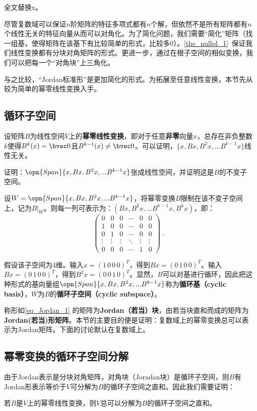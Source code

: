 

\begin{issues}
\issueDraft 全文替换x。
\end{issues}

尽管复数域可以保证$n$阶矩阵的特征多项式都有$n$个解，但依然不是所有矩阵都有$n$个线性无关的特征向量从而可以对角化。为了简化问题，我们需要“简化”矩阵（找一组基，使得矩阵在该基下有比较简单的形式，比较多$0$）。\autoref{the_nullpl_1}~保证我们线性变换都有分块对角矩阵的形式。更进一步，通过在根子空间的相似变换，我们可以把每一个“对角块”上三角化。

与之比较，“Jordan标准形”是更加简化的形式。为拓展至任意线性变换，本节先从较为简单的幂零线性变换入手。
\subsection{循环子空间}
设矩阵$B$为线性空间$V$上的\textbf{幂零线性变换}，即对于任意\textbf{非零}向量$x$，总存在非负整数$k$使得$B^{k}(x)=\bvec 0$且$B^{k-1}(x)\neq \bvec 0$。可以证明，$\{x,Bx,B^2x,...B^{k-1}x\}$线性无关。
\begin{exercise}{}
证明：$\opn{Span}\{x,Bx,B^2x,...B^{k-1}x\}$张成线性空间，并证明这是$B$的不变子空间。
\end{exercise}
设$W=\opn{Span}\{x,Bx,B^2x,...B^{k-1}x\}$，将幂零变换$B$限制在该不变子空间上，记为$B|_W$。则每一列可表示为：$(Bx,B^2x,...B^{k-1}x,B^kx)$，即：
\begin{equation}\label{eq_Jordan_1}
\left(\begin{array}{cccccc}
0 & 0 & 0 & \cdots & 0 & 0 \\
1 & 0 & 0 & \cdots & 0 & 0 \\
0 & 1 & 0 & \cdots & 0 & 0 \\
\vdots & \vdots & \vdots & \ddots & \vdots & \vdots \\
0 & 0 & 0 & \cdots & 1 & 0
\end{array}\right)~.
\end{equation}

假设该子空间为4维。输入$x=(1\,0\,0\,0)^T$，得到$Bx=(0\,1\,0\,0)^T$。输入$Bx=(0\,1\,0\,0)^T$，得到$B^2x=(0\,0\,1\,0)^T$。显然，$B$可以对基进行循环，因此把这种形式的基向量组$\opn{Span}\{x,Bx,B^2x,...B^{k-1}x\}$称为\textbf{循环基（cyclic basis）}，$W$为$B$的\textbf{循环子空间（cyclic subspace）}。

称形如\autoref{eq_Jordan_1} 的矩阵为\textbf{Jordan（若当）块}，由若当块直和而成的矩阵为\textbf{ Jordan(若当)形矩阵}。本节的主要目的便是证明：复数域上的幂零变换总可以表示为Jordan矩阵。下面的讨论默认在复数域上。


\subsection{幂零变换的循环子空间分解}

由于Jordan表示是分块对角矩阵，对角块（Joradan块）是循环子空间，则$B$有Jordan形表示等价于$V$可分解为$B$的循环子空间之直和。因此我们需要证明：

\begin{theorem}{}
若$B$是$V$上的幂零线性变换，则$V$总可以分解为$B$的循环子空间之直和。
\end{theorem}
